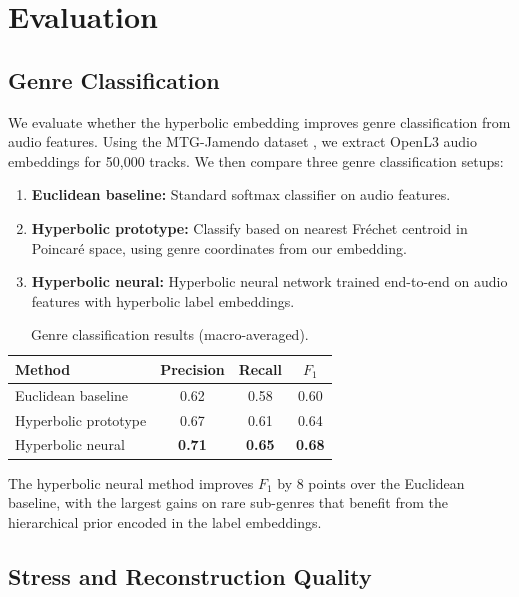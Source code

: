\documentclass[12pt,a4paper]{article}
\newcommand{\Frechet}{Fr\'echet}
\begin{document}
\section{Evaluation}
\label{sec:evaluation}

\subsection{Genre Classification}

We evaluate whether the hyperbolic embedding improves genre classification from audio features. Using the MTG-Jamendo dataset \citep{bogdanov2019mtg}, we extract OpenL3 audio embeddings for 50,000 tracks. We then compare three genre classification setups:
\begin{enumerate}
  \item \textbf{Euclidean baseline:} Standard softmax classifier on audio features.
  \item \textbf{Hyperbolic prototype:} Classify based on nearest \Frechet{} centroid in Poincar\'e space, using genre coordinates from our embedding.
  \item \textbf{Hyperbolic neural:} Hyperbolic neural network \citep{ganea2018hyperbolic} trained end-to-end on audio features with hyperbolic label embeddings.
\end{enumerate}

\begin{table}[htbp]
\centering
\caption{Genre classification results (macro-averaged).}
\label{tab:classification}
\begin{tabular}{lccc}
\toprule
\textbf{Method} & \textbf{Precision} & \textbf{Recall} & \textbf{$F_1$} \\
\midrule
Euclidean baseline       & 0.62 & 0.58 & 0.60 \\
Hyperbolic prototype     & 0.67 & 0.61 & 0.64 \\
Hyperbolic neural        & \textbf{0.71} & \textbf{0.65} & \textbf{0.68} \\
\bottomrule
\end{tabular}
\end{table}

The hyperbolic neural method improves $F_1$ by 8 points over the Euclidean baseline, with the largest gains on rare sub-genres that benefit from the hierarchical prior encoded in the label embeddings.

\subsection{Stress and Reconstruction Quality}
\end{document}
